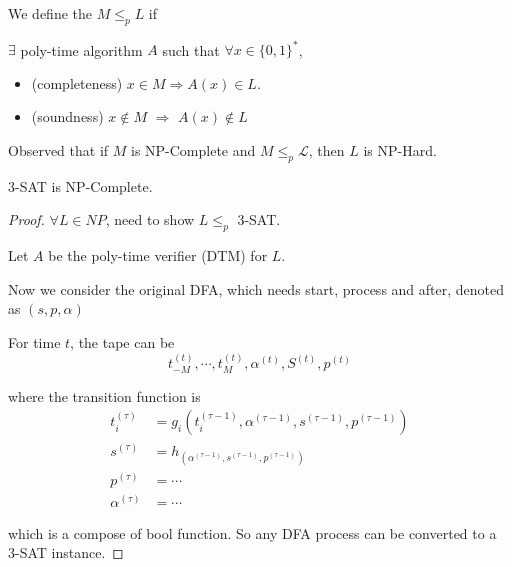 We define the   $ M \leq _p L $ if 

$ \exists  $ poly-time algorithm  $ A $ such that  $ \forall x\in \{0,1\}^* $,
\begin{itemize}
    \item (completeness)  $ x\in M\Rightarrow A(x)\in L $.
\item (soundness)  $ x\not\in M $ $ \Rightarrow  $  $ A(x)\not\in L $   
\end{itemize} 

Observed that if  $ M  $ is NP-Complete and  $ M \leq_p\mathcal L  $, then  $ L $ is NP-Hard.


\begin{theorem}
    3-SAT is NP-Complete.
\end{theorem}
\begin{proof}
    $ \forall L\in NP $, need to show  $ L \leq_p  $ 3-SAT.
    
    Let  $ A  $ be the poly-time verifier (DTM) for  $ L $.

    Now we consider the original DFA, which needs start, process and after, denoted as  $ (s,p,\alpha) $ 

    For time  $ t $, the tape can be 
    \[t_{-M}^{(t)},\cdots,t_M^{(t)},\alpha^{(t)},S^{(t)},p^{(t)}\]

    where the transition function is 
    \begin{align*}
        t_i^{(\tau)}&=g_i(t_i^{(\tau-1)},\alpha^{(\tau-1)},s^{(\tau-1)},p^{(\tau-1)})\\
        s^{(\tau)}&=h_(\alpha^{(\tau-1)},s^{(\tau-1)},p^{(\tau-1)})\\
        p^{(\tau)}&=\cdots\\
        \alpha^{(\tau)}&=\cdots
    \end{align*}

    which is a compose of bool function. So any DFA process can be converted to a 3-SAT instance.
    
\end{proof}

